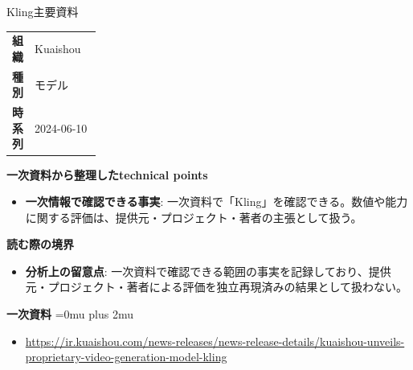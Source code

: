 \begin{technicalnote}{Kling}{主要資料}
\begingroup
\begin{tabularx}{\linewidth}{@{}>{\bfseries}p{0.22\linewidth}X@{}}
組織 & Kuaishou \\
種別 & モデル \\
時系列 & 2024-06-10 \\
\end{tabularx}
\smallskip
{\bfseries 一次資料から整理したtechnical points}
\begin{itemize}[leftmargin=1.5em,itemsep=0.35em]
\item \textbf{一次情報で確認できる事実}: 一次資料で「Kling」を確認できる。数値や能力に関する評価は、提供元・プロジェクト・著者の主張として扱う。
\end{itemize}
\begin{minipage}{\linewidth}
{\bfseries 読む際の境界}
\begin{itemize}[leftmargin=1.5em,itemsep=0.35em]
\item \textbf{分析上の留意点}: 一次資料で確認できる範囲の事実を記録しており、提供元・プロジェクト・著者による評価を独立再現済みの結果として扱わない。
\end{itemize}
\begin{samepage}
{\bfseries 一次資料}
\begingroup\sloppy
\Urlmuskip=0mu plus 2mu\relax
\begin{itemize}[leftmargin=1.5em,itemsep=0.25em]
\item {\scriptsize\url{https://ir.kuaishou.com/news-releases/news-release-details/kuaishou-unveils-proprietary-video-generation-model-kling}}
\end{itemize}
\endgroup
\end{samepage}
\end{minipage}
\endgroup
\end{technicalnote}
\medskip

